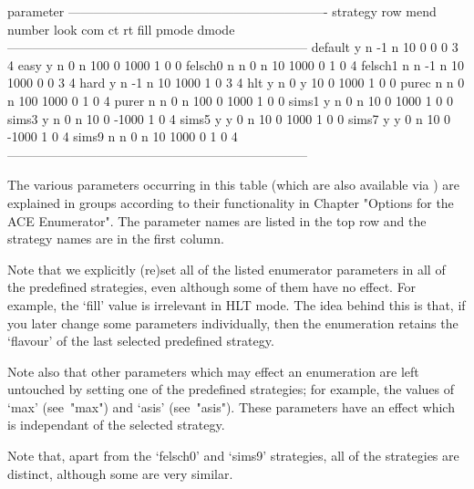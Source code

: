 \begintt
                                   parameter
          -------------------------------------------------------------
strategy  row  mend  number  look  com    ct     rt  fill  pmode  dmode
-----------------------------------------------------------------------
default     y     n      -1     n   10     0      0     0      3      4
easy        y     n       0     n  100     0   1000     1      0      0
felsch0     n     n       0     n   10  1000      0     1      0      4
felsch1     n     n      -1     n   10  1000      0     0      3      4
hard        y     n      -1     n   10  1000      1     0      3      4
hlt         y     n       0     y   10     0   1000     1      0      0
purec       n     n       0     n  100  1000      0     1      0      4
purer       n     n       0     n  100     0   1000     1      0      0
sims1       y     n       0     n   10     0   1000     1      0      0
sims3       y     n       0     n   10     0  -1000     1      0      4
sims5       y     y       0     n   10     0   1000     1      0      0
sims7       y     y       0     n   10     0  -1000     1      0      4
sims9       n     n       0     n   10  1000      0     1      0      4
-----------------------------------------------------------------------
\endtt

The  various  parameters  occurring  in  this table  (which  are  also
available  via {\GAP})  are  explained in  groups  according to  their
functionality  in  Chapter  "Options  for the  ACE  Enumerator".   The
parameter names are  listed in the top row and  the strategy names are
in the first column.

Note  that  we  explicitly   (re)set  all  of  the  listed  enumerator
parameters in all of the  predefined strategies, even although some of
them have  no effect. For example,  the `fill' value  is irrelevant in
HLT mode.   The idea  behind this  is that, if  you later  change some
parameters individually, then the enumeration retains the `flavour' of
the  last   selected  predefined  strategy.   

Note also  that other parameters  which may effect an  enumeration are
left  untouched  by setting  one  of  the  predefined strategies;  for
example,  the values  of  `max' (see~"max")  and `asis'  (see~"asis").
These parameters have  an effect which is independant  of the selected
strategy.

Note that, apart from the `felsch0' and `sims9' strategies, all of the
strategies are distinct, although some are very similar.


